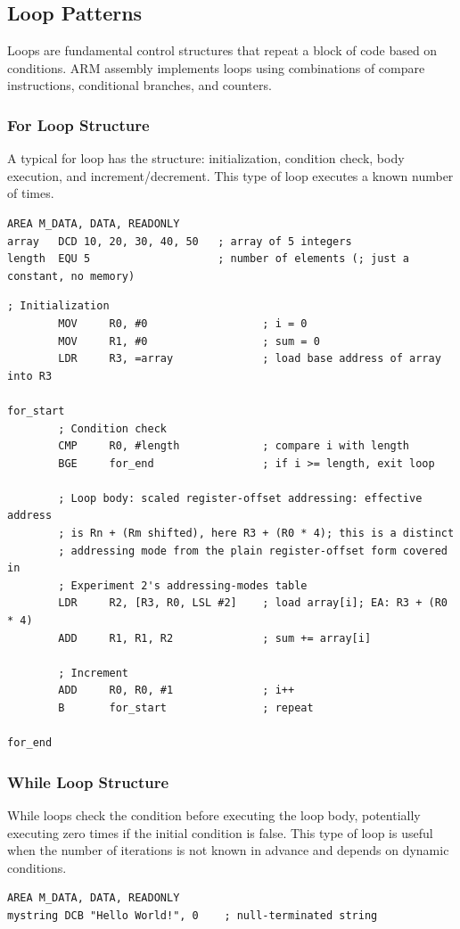 \subsection{Loop Patterns}
Loops are fundamental control structures that repeat a block of code based on conditions. ARM assembly implements loops using combinations of compare instructions, conditional branches, and counters.

\subsubsection{For Loop Structure}
A typical for loop has the structure: initialization, condition check, body execution, and increment/decrement. This type of loop executes a known number of times.
\begin{lstlisting}[caption={Declaring Array and Length}]
        AREA M_DATA, DATA, READONLY
array   DCD 10, 20, 30, 40, 50   ; array of 5 integers
length  EQU 5                    ; number of elements (; just a constant, no memory)
\end{lstlisting}
\begin{lstlisting}[caption={For loop implementation pattern}]
        ; Initialization
        MOV     R0, #0                  ; i = 0
        MOV     R1, #0                  ; sum = 0
        LDR     R3, =array              ; load base address of array into R3

for_start
        ; Condition check
        CMP     R0, #length             ; compare i with length
        BGE     for_end                 ; if i >= length, exit loop

        ; Loop body: scaled register-offset addressing: effective address
        ; is Rn + (Rm shifted), here R3 + (R0 * 4); this is a distinct
        ; addressing mode from the plain register-offset form covered in
        ; Experiment 2's addressing-modes table
        LDR     R2, [R3, R0, LSL #2]    ; load array[i]; EA: R3 + (R0 * 4)
        ADD     R1, R1, R2              ; sum += array[i]

        ; Increment
        ADD     R0, R0, #1              ; i++
        B       for_start               ; repeat

for_end
\end{lstlisting}
\subsubsection{While Loop Structure}
While loops check the condition before executing the loop body, potentially executing zero times if the initial condition is false. This type of loop is useful when the number of iterations is not known in advance and depends on dynamic conditions.
\begin{lstlisting}[caption={Declaring Null-Terminated String}]
        AREA M_DATA, DATA, READONLY
mystring DCB "Hello World!", 0    ; null-terminated string
\end{lstlisting}

